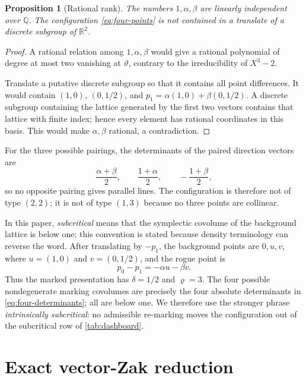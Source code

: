 \documentclass[11pt,reqno]{amsart}
\numberwithin{equation}{section}
\newtheorem{proposition}[theorem]{Proposition}
\theoremstyle{definition}
\newcommand{\R}{\mathbb R}
\newcommand{\Q}{\mathbb Q}
\begin{document}
\begin{proposition}[Rational rank]\label{prop:rational-rank}
The numbers $1,\alpha,\beta$ are linearly independent over $\Q$.  The
configuration \eqref{eq:four-points} is not contained in a translate of a
discrete subgroup of $\R^2$.
\end{proposition}

\begin{proof}
A rational relation among $1,\alpha,\beta$ would give a rational polynomial
of degree at most two vanishing at $\vartheta$, contrary to the
irreducibility of $X^3-2$.

Translate a putative discrete subgroup so that it contains all point
differences.  It would contain $(1,0)$, $(0,1/2)$, and
$p_1=\alpha(1,0)+\beta(0,1/2)$.  A discrete subgroup containing the lattice
generated by the first two vectors contains that lattice with finite index;
hence every element has rational coordinates in this basis.  This would make
$\alpha,\beta$ rational, a contradiction.
\end{proof}

For the three possible pairings, the determinants of the paired direction
vectors are
\[
 \frac{\alpha+\beta}{2},\qquad
 \frac{1+\alpha}{2},\qquad
 -\frac{1+\beta}{2},
\]
so no opposite pairing gives parallel lines.  The configuration is therefore
not of type $(2,2)$; it is not of type $(1,3)$ because no three points are
collinear.

In this paper, \emph{subcritical} means that the symplectic covolume of the
background lattice is below one; this convention is stated because density
terminology can reverse the word.  After translating by $-p_1$, the
background points are $0,u,v$, where $u=(1,0)$ and $v=(0,1/2)$, and the
rogue point is
\[
 p_0-p_1=-\alpha u-\beta v.
\]
Thus the marked presentation has $\delta=1/2$ and $\varrho=3$.  The four
possible nondegenerate marking covolumes are precisely the four absolute
determinants in \eqref{eq:four-determinants}; all are below one.  We therefore
use the stronger phrase \emph{intrinsically subcritical}: no admissible
re-marking moves the configuration out of the subcritical row of
\cref{tab:dashboard}.

\section{Exact vector-Zak reduction}
\label{sec:zak}
\end{document}
